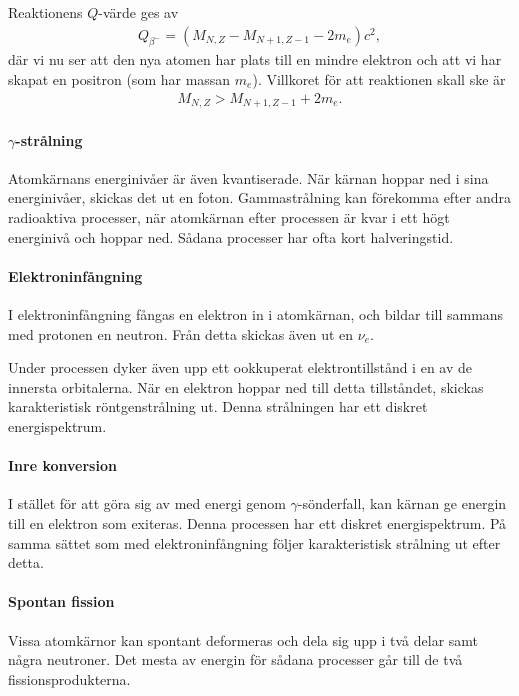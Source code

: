 Reaktionens $Q$-värde ges av
\begin{align*}
	Q_{\beta^{-}} = (M_{N, Z} - M_{N + 1, Z - 1} - 2m_{e})c^{2},
\end{align*}
där vi nu ser att den nya atomen har plats till en mindre elektron och att vi har skapat en positron (som har massan $m_{e}$). Villkoret för att reaktionen skall ske är
\begin{align*}
	M_{N, Z} > M_{N + 1, Z - 1} + 2m_{e}.
\end{align*}

\paragraph{$\gamma$-strålning}
Atomkärnans energinivåer är även kvantiserade. När kärnan hoppar ned i sina energinivåer, skickas det ut en foton. Gammastrålning kan förekomma efter andra radioaktiva processer, när atomkärnan efter processen är kvar i ett högt energinivå och hoppar ned. Sådana processer har ofta kort halveringstid.

\paragraph{Elektroninfångning}
I elektroninfångning fångas en elektron in i atomkärnan, och bildar till sammans med protonen en neutron. Från detta skickas även ut en $\nu_{e}$.

Under processen dyker även upp ett ookkuperat elektrontillstånd i en av de innersta orbitalerna. När en elektron hoppar ned till detta tillståndet, skickas karakteristisk röntgenstrålning ut. Denna strålningen har ett diskret energispektrum.

\paragraph{Inre konversion}
I stället för att göra sig av med energi genom $\gamma$-sönderfall, kan kärnan ge energin till en elektron som exiteras. Denna processen har ett diskret energispektrum. På samma sättet som med elektroninfångning följer karakteristisk strålning ut efter detta.

\paragraph{Spontan fission}
Vissa atomkärnor kan spontant deformeras och dela sig upp i två delar samt några neutroner. Det mesta av energin för sådana processer går till de två fissionsprodukterna.